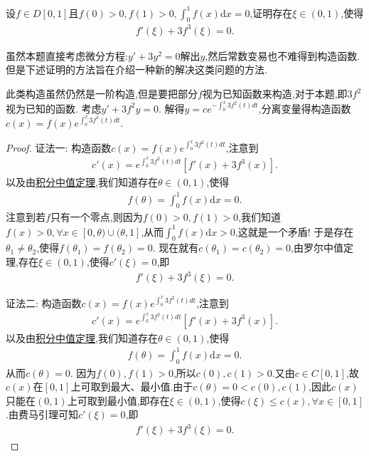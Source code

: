 \documentclass[../../main.tex]{subfiles}
\begin{document}
\begin{example}
设\(f\in D[0,1]\)且\(f(0)>0,f(1)>0,\int_{0}^{1} f(x)\mathrm{d}x = 0\),证明存在\(\xi\in(0,1)\),使得
\begin{align*}
f'(\xi)+3f^{3}(\xi)=0.
\end{align*}
\end{example}
\begin{remark}
虽然本题直接考虑微分方程:$y'+3y^2=0$解出$y$,然后常数变易也不难得到构造函数.但是下述证明的方法旨在介绍一种新的解决这类问题的方法.
\end{remark}
\begin{note}
此类构造虽然仍然是一阶构造,但是要把部分\(f\)视为已知函数来构造,对于本题,即\(3f^{2}\)视为已知的函数. 考虑\(y'+3f^{2}y = 0\). 解得\(y = ce^{-\int_{0}^{x} 3f^{2}(t)dt}\),分离变量得构造函数\(c(x)=f(x)e^{\int_{0}^{x} 3f^{2}(t)dt}\).
\end{note}
\begin{proof}
{\color{blue}证法一:}
构造函数\(c(x)=f(x)e^{\int_{0}^{x} 3f^{2}(t)dt}\),注意到
\begin{align*}
c'(x)=e^{\int_{0}^{x} 3f^{2}(t)dt}[f'(x)+3f^{3}(x)].
\end{align*}
以及由\hyperref[theorem:积分中值定理]{积分中值定理},我们知道存在\(\theta\in(0,1)\),使得
\begin{align*}
f(\theta)=\int_{0}^{1} f(x)\mathrm{d}x = 0.
\end{align*}
注意到若\(f\)只有一个零点,则因为\(f(0)>0,f(1)>0\),我们知道\(f(x)>0,\forall x\in[0,\theta)\cup(\theta,1]\),从而\(\int_{0}^{1} f(x)\mathrm{d}x>0\),这就是一个矛盾!
于是存在\(\theta_1\neq\theta_2\),使得\(f(\theta_1)=f(\theta_2)=0\). 现在就有\(c(\theta_1)=c(\theta_2)=0\),由罗尔中值定理,存在\(\xi\in(0,1)\),使得\(c'(\xi)=0\),即
\begin{align*}
f'(\xi)+3f^{3}(\xi)=0.
\end{align*}

{\color{blue}证法二:}
构造函数\(c(x)=f(x)e^{\int_{0}^{x} 3f^{2}(t)dt}\),注意到
\begin{align*}
c'(x)=e^{\int_{0}^{x} 3f^{2}(t)dt}[f'(x)+3f^{3}(x)].
\end{align*}
以及由\hyperref[theorem:积分中值定理]{积分中值定理},我们知道存在\(\theta\in(0,1)\),使得
\begin{align*}
f(\theta)=\int_{0}^{1} f(x)\mathrm{d}x = 0.
\end{align*}
从而$c(\theta)=0$.
因为$f(0),f(1)>0$,所以$c(0),c(1)>0$.又由$c\in C[0,1]$,故$c(x)$在$[0,1]$上可取到最大、最小值.由于$c(\theta)=0<c(0),c(1)$,因此$c(x)$只能在$(0,1)$上可取到最小值,即存在\(\xi\in(0,1)\),使得$c(\xi)\leq c(x),\forall x\in[0,1]$.由费马引理可知\(c'(\xi)=0\),即
\begin{align*}
f'(\xi)+3f^{3}(\xi)=0.
\end{align*}
\end{proof}
\end{document}
